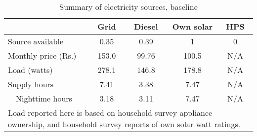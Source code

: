 \begin{table}[htbp]\centering
\caption{Summary of electricity sources, baseline\label{tab:sourcestats}}
\begin{tabular}{l*{4}{c}}
\toprule
                &     Grid&   Diesel & Own solar &      HPS\\
\midrule

Source available &    0.35&    0.39&        1&        0\\
\addlinespace
Monthly price (Rs.)&    153.0&    99.76&    100.5&      N/A\\

Load (watts)&    278.1&    146.8&    178.8 &       N/A\\

Supply hours&    7.41&    3.38&    7.47 &        N/A\\

~~Nighttime hours &  3.18&3.11   &7.47  &N/A  \\
\bottomrule
\multicolumn{5}{p{11cm}}{\footnotesize Load reported here is based on household survey appliance ownership, and household survey reports of own solar watt ratings.}\\
\end{tabular}
\end{table}
